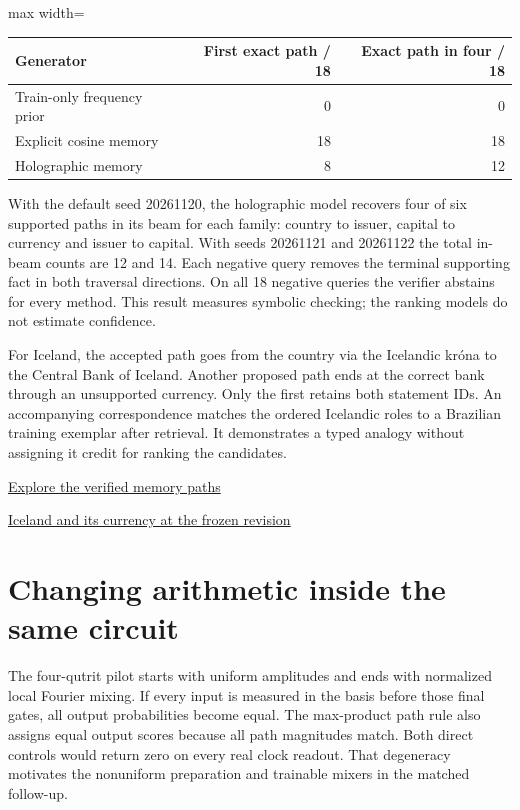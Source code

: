 \documentclass[11pt,oneside,openany]{book}
\begin{document}
\begin{center}\footnotesize\sffamily\setlength{\tabcolsep}{3.5pt}\renewcommand{\arraystretch}{1.2}
\begin{adjustbox}{max width=\linewidth}\begin{tabular}{@{}lrr@{}}\toprule
Generator & First exact path / 18 & Exact path in four / 18 \\ \midrule
Train-only frequency prior & 0 & 0 \\
Explicit cosine memory & 18 & 18 \\
Holographic memory & 8 & 12 \\
\bottomrule\end{tabular}\end{adjustbox}\end{center}
With the default seed 20261120, the holographic model recovers four of six supported paths in its beam for each family: country to issuer, capital to currency and issuer to capital. With seeds 20261121 and 20261122 the total in-beam counts are 12 and 14. Each negative query removes the terminal supporting fact in both traversal directions. On all 18 negative queries the verifier abstains for every method. This result measures symbolic checking; the ranking models do not estimate confidence.

For Iceland, the accepted path goes from the country via the Icelandic króna to the Central Bank of Iceland. Another proposed path ends at the correct bank through an unsupported currency. Only the first retains both statement IDs. An accompanying correspondence matches the ordered Icelandic roles to a Brazilian training exemplar after retrieval. It demonstrates a typed analogy without assigning it credit for ranking the candidates.

{\small\sffamily\href{https://amelie-iska.github.io/phaseweave-lab/memory.html}{Explore the verified memory paths}\par}
{\small\sffamily\href{https://www.wikidata.org/wiki/Special:EntityData/Q189.json?revision=2569305992}{Iceland and its currency at the frozen revision}\par}
\section*{Changing arithmetic inside the same circuit}
The four-qutrit pilot starts with uniform amplitudes and ends with normalized local Fourier mixing. If every input is measured in the basis before those final gates, all output probabilities become equal. The max-product path rule also assigns equal output scores because all path magnitudes match. Both direct controls would return zero on every real clock readout. That degeneracy motivates the nonuniform preparation and trainable mixers in the matched follow-up.
\end{document}
